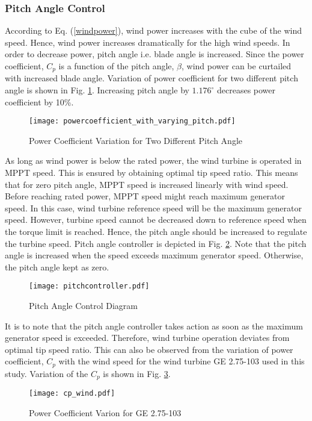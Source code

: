 \subsubsection{Pitch Angle Control}
According to Eq. (\ref{windpower}), wind power increases with the cube of the wind speed. Hence, wind power increases dramatically for the high wind speeds. In order to decrease power, pitch angle i.e. blade angle is increased. Since the power coefficient, $C_{p}$ is a function of the pitch angle, $\beta$, wind power can be curtailed with increased blade angle. Variation of power coefficient for two different pitch angle is shown in Fig. \ref{cpwithtwopitchangle}. Increasing pitch angle by $1.176^{\circ}$ decreases power coefficient by 10\%.\par
\begin{figure}[h!]
	\centering
	\texttt{[image: powercoefficient\_with\_varying\_pitch.pdf]}
	\caption{Power Coefficient Variation for Two Different Pitch Angle}
	\label{cpwithtwopitchangle}
\end{figure} 
As long as wind power is below the rated power, the wind turbine is operated in MPPT speed. This is ensured by obtaining optimal tip speed ratio. This means that for zero pitch angle, MPPT speed is increased linearly with wind speed. Before reaching rated power, MPPT speed might reach maximum generator speed. In this case, wind turbine reference speed will be the maximum generator speed. However, turbine speed cannot be decreased down to reference speed when the torque limit is reached. Hence, the pitch angle should be increased to regulate the turbine speed. Pitch angle controller is depicted in Fig. \ref{pitchcontroller}. Note that the pitch angle is increased when the speed exceeds maximum generator speed. Otherwise, the pitch angle kept as zero. \par
\begin{figure}[h!]
	\centering
	\texttt{[image: pitchcontroller.pdf]}
	\caption{Pitch Angle Control Diagram}
	\label{pitchcontroller}
\end{figure}
It is to note that the pitch angle controller takes action as soon as the maximum generator speed is exceeded. Therefore, wind turbine operation deviates from optimal tip speed ratio. This can also be observed from the variation of power coefficient, $C_{p}$ with the wind speed for the wind turbine GE 2.75-103 used in this study. Variation of the $C_{p}$ is shown in Fig. \ref{powercoefficientge}.
\begin{figure}[h!]
	\centering
	\texttt{[image: cp\_wind.pdf]}
	\caption{Power Coefficient Varion for GE 2.75-103}
	\label{powercoefficientge}
\end{figure}
